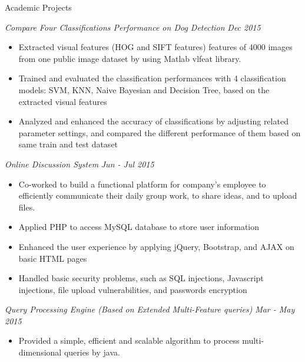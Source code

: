 \documentclass{resume} 		%
\begin{document}
\begin{rSection}{Academic Projects}

{\sl Compare Four Classifications Performance on Dog Detection} \hfill {\em Dec 2015} 
\begin{itemize}   				
 \setlength\itemsep{-0.5em}		%
 \renewcommand\labelitemi{--}		%
\item Extracted visual features (HOG and SIFT features) features of 4000 images from one public image dataset by using Matlab vlfeat library.
\item Trained and evaluated the classification performances with 4 classification models: SVM, KNN, Naive Bayesian and Decision Tree, based on the extracted visual features
\item  Analyzed and enhanced the accuracy of classifications by adjusting related parameter settings, and compared the different performance of them based on same train and test dataset
\end{itemize}
{\sl Online Discussion System} \hfill {\em Jun - Jul 2015} 
\begin{itemize}   				
 \setlength\itemsep{-0.5em}		%
 \renewcommand\labelitemi{--}		%
\item Co-worked to build a functional platform for company's employee to efficiently communicate their daily group work, to share ideas, and to upload files.
\item Applied PHP to access MySQL database to store user information
\item Enhanced the user experience by applying jQuery, Bootstrap, and AJAX on basic HTML pages
\item Handled basic security problems, such as SQL injections, Javascript injections, file upload vulnerabilities, and passwords encryption
\end{itemize}
{\sl Query Processing Engine (Based on Extended Multi-Feature queries)} \hfill {\em Mar - May 2015} 
\begin{itemize}  
 \setlength\itemsep{-0.5em}		%
 \renewcommand\labelitemi{--}		%
\item Provided a simple, efficient and scalable algorithm to process multi-dimensional queries by java.

\end{itemize}
\end{rSection}
\end{document}
